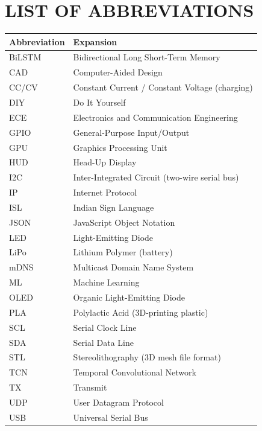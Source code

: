 \documentclass[12pt,a4paper]{report}
\begin{document}
\chapter*{LIST OF ABBREVIATIONS}
\begin{center}
\begin{longtable}{L{3cm} L{9cm}}
\toprule
\textbf{Abbreviation} & \textbf{Expansion} \\
\midrule
\endhead
BiLSTM & Bidirectional Long Short-Term Memory \\
CAD & Computer-Aided Design \\
CC/CV & Constant Current / Constant Voltage (charging) \\
DIY & Do It Yourself \\
ECE & Electronics and Communication Engineering \\
GPIO & General-Purpose Input/Output \\
GPU & Graphics Processing Unit \\
HUD & Head-Up Display \\
I2C & Inter-Integrated Circuit (two-wire serial bus) \\
IP & Internet Protocol \\
ISL & Indian Sign Language \\
JSON & JavaScript Object Notation \\
LED & Light-Emitting Diode \\
LiPo & Lithium Polymer (battery) \\
mDNS & Multicast Domain Name System \\
ML & Machine Learning \\
OLED & Organic Light-Emitting Diode \\
PLA & Polylactic Acid (3D-printing plastic) \\
SCL & Serial Clock Line \\
SDA & Serial Data Line \\
STL & Stereolithography (3D mesh file format) \\
TCN & Temporal Convolutional Network \\
TX & Transmit \\
UDP & User Datagram Protocol \\
USB & Universal Serial Bus \\
\bottomrule
\end{longtable}
\end{center}

\end{document}
